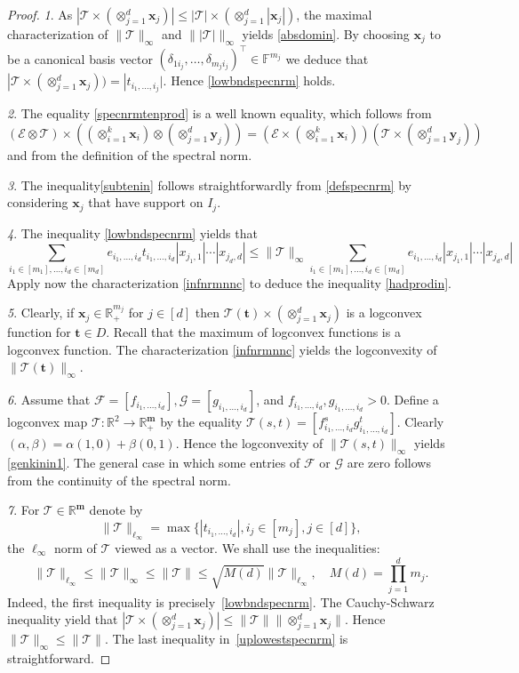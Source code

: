 \documentclass{amsart}
\newcommand{\F}{\mathbb{F}}
\newcommand{\R}{\mathbb{R}}
\newcommand{\m}{\mathbf{m}}
\newcommand{\bt}{\mathbf{t}}
\newcommand{\x}{\mathbf{x}}
\newcommand{\y}{\mathbf{y}}
\newcommand{\0}{\mathbf{0}}
\newcommand{\1}{\mathbf{1}}
\newcommand{\cE}{\mathcal{E}}
\newcommand{\cF}{\mathcal{F}}
\newcommand{\cG}{\mathcal{G}}
\newcommand{\cT}{\mathcal{T}}
\newcommand{\trans}{^\top}
\theoremstyle{remark}
\numberwithin{equation}{section} %
\renewcommand{\le}{\leqslant}
\begin{document}
\begin{proof}   \emph{1}.  As $|\cT\times(\otimes_{j=1}^d \x_j)|\le |\cT|\times(\otimes_{j=1}^d|\x_j|)$, the maximal characterization of $\|\cT\|_{\infty}$ and $\||\cT|\|_{\infty}$ yields
\eqref{absdomin}.  By choosing $\x_j$ to be a canonical basis vector $(\delta_{1i_j},\ldots,\delta_{m_ji_j})\trans\in\F^{m_j}$ we deduce that $|\cT\times (\otimes_{j=1}^d \x_j))=
|t_{i_1,\ldots,i_j}|$.  Hence \eqref{lowbndspecnrm} holds.

\emph{2}.  The equality \eqref{specnrmtenprod} is a well known equality, which follows from 
\[(\cE\otimes\cT)\times((\otimes_{i=1}^k \x_i)\otimes(\otimes_{j=1}^d \y_j))=(\cE\times(\otimes_{i=1}^k \x_i))(\cT\times (\otimes_{j=1}^d \y_j)) \]
and from the definition of the spectral norm.

\emph{3}.  The inequality\eqref{subtenin} follows straightforwardly from \eqref{defspecnrm} by considering $\x_j$ that have support on $I_j$. 

\emph{4}.  The inequality \eqref{lowbndspecnrm} yields that 
\[\sum_{i_1\in[m_1],\ldots,i_d\in[m_d]} e_{i_1,\ldots,i_d}t_{i_1,\ldots,i_d}|x_{j_1,1}|\cdots |x_{j_d,d}|\le \|\cT\|_{\infty}\!\!\!\!
\sum_{i_1\in[m_1],\ldots,i_d\in[m_d]} e_{i_1,\ldots,i_d}|x_{j_1,1}|\cdots |x_{j_d,d}|\]
Apply now the characterization \eqref{infnrmnnc} to deduce the inequality \eqref{hadprodin}.

\emph{5}.  Clearly, if $\x_j\in\R^{m_j}_+$ for $j\in[d]$ then  $\cT(\bt)\times(\otimes_{j=1}^d \x_j)$ is a logconvex function for $\bt\in D$. Recall that the maximum of logconvex functions is a logconvex function.  The characterization \eqref{infnrmnnc} yields the logconvexity of $\|\cT(\bt)\|_{\infty}$.

\emph{6}.  Assume that $\cF=[f_{i_1,\ldots,i_d}],\cG=[g_{i_1,\ldots,i_d}]$, and $f_{i_1,\ldots,i_d}, g_{i_1,\ldots,i_d}>0$.  Define a logconvex map $\cT:\R^2\to \R^{\m}_+$
by the equality $\cT(s,t)=[f_{i_1,\ldots,i_d}^s g_{i_1,\ldots,i_d}^t]$.  Clearly $(\alpha,\beta)=\alpha(1,0)+\beta(0,1)$.  Hence the logconvexity of $\|\cT(s,t)\|_{\infty}$ yields
 \eqref{genkinin1}.  The general case in which some entries of $\cF$ or $\cG$ are zero follows from the continuity of the spectral norm.
 
 \emph{7}.  For $\cT\in\R^{\m}$ denote by
 \[\|\cT\|_{\ell_{\infty}}=\max\{|t_{i_1,\ldots,i_d}|, i_j\in[m_j], j\in[d]\},\]
 the $\ell_{\infty}$ norm of $\cT$ viewed as a vector.  
We shall use the inequalities:
%
 \begin{equation}\label{uplowestspecnrm}
 \|\cT\|_{\ell_{\infty}}\le \|\cT\|_{\infty}\le \|\cT\|\le \sqrt{M(d)}\|\cT\|_{\ell_{\infty}}, \quad M(d)=\prod_{j=1}^d m_j.
 \end{equation}
 Indeed, the first inequality is precisely~\eqref{lowbndspecnrm}.
%
%
%
The Cauchy-Schwarz inequality yield that $|\cT\times(\otimes_{j=1}^d\x_j)|\le \|\cT\| \|\otimes_{j=1}^d\x_j\|$.
Hence $\|\cT\|_{\infty}\le \|\cT\|$.   The last inequality in~\eqref{uplowestspecnrm} is straightforward. 


\end{proof}
\end{document}
